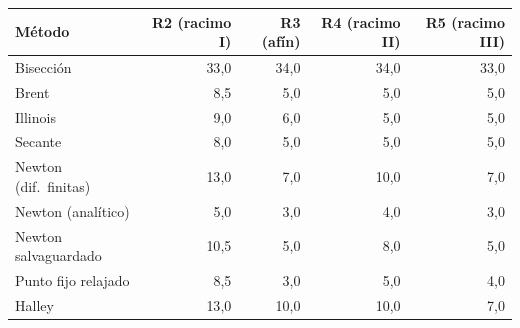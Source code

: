 \begin{tabular}{@{}lrrrr@{}}
\toprule
\textbf{Método} & \textbf{R2 (racimo I)} & \textbf{R3 (afín)} & \textbf{R4 (racimo II)} & \textbf{R5 (racimo III)} \\
\midrule
Bisección & 33{,}0 & 34{,}0 & 34{,}0 & 33{,}0 \\
Brent & 8{,}5 & 5{,}0 & 5{,}0 & 5{,}0 \\
Illinois & 9{,}0 & 6{,}0 & 5{,}0 & 5{,}0 \\
Secante & 8{,}0 & 5{,}0 & 5{,}0 & 5{,}0 \\
Newton (dif.\ finitas) & 13{,}0 & 7{,}0 & 10{,}0 & 7{,}0 \\
Newton (analítico) & 5{,}0 & 3{,}0 & 4{,}0 & 3{,}0 \\
Newton salvaguardado & 10{,}5 & 5{,}0 & 8{,}0 & 5{,}0 \\
Punto fijo relajado & 8{,}5 & 3{,}0 & 5{,}0 & 4{,}0 \\
Halley & 13{,}0 & 10{,}0 & 10{,}0 & 7{,}0 \\
\bottomrule
\end{tabular}